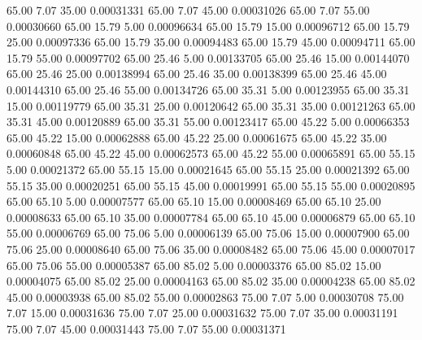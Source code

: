      65.00      7.07     35.00     0.00031331
     65.00      7.07     45.00     0.00031026
     65.00      7.07     55.00     0.00030660
     65.00     15.79      5.00     0.00096634
     65.00     15.79     15.00     0.00096712
     65.00     15.79     25.00     0.00097336
     65.00     15.79     35.00     0.00094483
     65.00     15.79     45.00     0.00094711
     65.00     15.79     55.00     0.00097702
     65.00     25.46      5.00     0.00133705
     65.00     25.46     15.00     0.00144070
     65.00     25.46     25.00     0.00138994
     65.00     25.46     35.00     0.00138399
     65.00     25.46     45.00     0.00144310
     65.00     25.46     55.00     0.00134726
     65.00     35.31      5.00     0.00123955
     65.00     35.31     15.00     0.00119779
     65.00     35.31     25.00     0.00120642
     65.00     35.31     35.00     0.00121263
     65.00     35.31     45.00     0.00120889
     65.00     35.31     55.00     0.00123417
     65.00     45.22      5.00     0.00066353
     65.00     45.22     15.00     0.00062888
     65.00     45.22     25.00     0.00061675
     65.00     45.22     35.00     0.00060848
     65.00     45.22     45.00     0.00062573
     65.00     45.22     55.00     0.00065891
     65.00     55.15      5.00     0.00021372
     65.00     55.15     15.00     0.00021645
     65.00     55.15     25.00     0.00021392
     65.00     55.15     35.00     0.00020251
     65.00     55.15     45.00     0.00019991
     65.00     55.15     55.00     0.00020895
     65.00     65.10      5.00     0.00007577
     65.00     65.10     15.00     0.00008469
     65.00     65.10     25.00     0.00008633
     65.00     65.10     35.00     0.00007784
     65.00     65.10     45.00     0.00006879
     65.00     65.10     55.00     0.00006769
     65.00     75.06      5.00     0.00006139
     65.00     75.06     15.00     0.00007900
     65.00     75.06     25.00     0.00008640
     65.00     75.06     35.00     0.00008482
     65.00     75.06     45.00     0.00007017
     65.00     75.06     55.00     0.00005387
     65.00     85.02      5.00     0.00003376
     65.00     85.02     15.00     0.00004075
     65.00     85.02     25.00     0.00004163
     65.00     85.02     35.00     0.00004238
     65.00     85.02     45.00     0.00003938
     65.00     85.02     55.00     0.00002863
     75.00      7.07      5.00     0.00030708
     75.00      7.07     15.00     0.00031636
     75.00      7.07     25.00     0.00031632
     75.00      7.07     35.00     0.00031191
     75.00      7.07     45.00     0.00031443
     75.00      7.07     55.00     0.00031371
